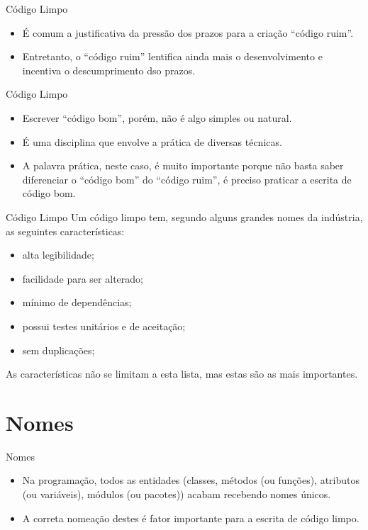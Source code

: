 \documentclass[11pt]{beamer}
\begin{document}
  \begin{frame}{Código Limpo}
    \begin{itemize}
      \item É comum a justificativa da pressão dos prazos para a criação ``código ruim''.
      \item Entretanto, o ``código ruim'' lentifica ainda mais o desenvolvimento e incentiva o descumprimento dso prazos.  
    \end{itemize}
  \end{frame}

  \begin{frame}{Código Limpo}
    \begin{itemize}
      \item Escrever ``código bom'', porém, não é algo simples ou natural.
      \item É uma disciplina que envolve a prática de diversas técnicas.
      \item A palavra prática, neste caso, é muito importante porque não basta saber diferenciar o ``código bom'' do ``código ruim'', é preciso praticar a escrita de código bom.
    \end{itemize}
  \end{frame}

  \begin{frame}{Código Limpo}
    Um código limpo tem, segundo alguns grandes nomes da indústria, as seguintes características: 
    \begin{itemize}
      \item alta legibilidade;
      \item facilidade para ser alterado;
      \item mínimo de dependências;
      \item possui testes unitários e de aceitação;
      \item sem duplicações;
    \end{itemize}
    As características não se limitam a esta lista, mas estas são as mais importantes.
  \end{frame}

  \section{Nomes}
    
  \begin{frame}{Nomes}
    \begin{itemize}
      \item Na programação, todos as entidades (classes, métodos (ou funções), atributos (ou variáveis), módulos (ou pacotes)) acabam recebendo nomes únicos.
      \item A correta nomeação destes é fator importante para a escrita de código limpo.
    \end{itemize}
  \end{frame}
\end{document}
